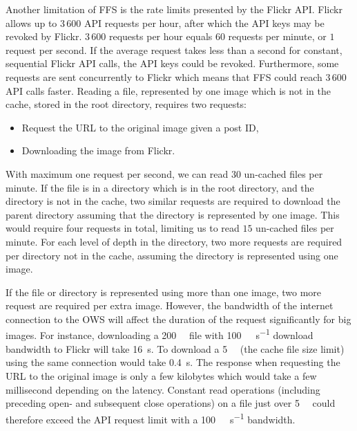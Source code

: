 Another limitation of \gls{FFS} is the rate limits presented by the Flickr \gls{API}. Flickr allows up to $3\,600$ \gls{API} requests per hour, after which the \gls{API} keys may be revoked by Flickr. $3\,600$ requests per hour equals $60$ requests per minute, or $1$ request per second. If the average request takes less than a second for constant, sequential Flickr \gls{API} calls, the \gls{API} keys could be revoked. Furthermore, some requests are sent concurrently to Flickr which means that \gls{FFS} could reach $3\,600$ \gls{API} calls faster. Reading a file, represented by one image which is not in the cache, stored in the root directory, requires two requests:
\begin{itemize}
	\item Request the URL to the original image given a post ID,
	\item Downloading the image from Flickr. 
\end{itemize}
With maximum one request per second, we can read $30$ un-cached files per minute. If the file is in a directory which is in the root directory, and the directory is not in the cache, two similar requests are required to download the parent directory assuming that the directory is represented by one image. This would require four requests in total, limiting us to read $15$ un-cached files per minute. For each level of depth in the directory, two more requests are required per directory not in the cache, assuming the directory is represented using one image. 

If the file or directory is represented using more than one image, two more request are required per extra image. However, the bandwidth of the internet connection to the \gls{OWS} will affect the duration of the request significantly for big images. For instance, downloading a \SI[per-mode = symbol]{200}{\mega\byte} file with \SI[per-mode = symbol]{100}{\mega\bit\per\second} download bandwidth to Flickr will take \SI[per-mode = symbol]{16}{\second}. To download a \SI[per-mode = symbol]{5}{\mega\byte} (the cache file size limit) using the same connection would take \SI[per-mode = symbol]{0.4}{\second}. The response when requesting the URL to the original image is only a few kilobytes which would take a few millisecond depending on the latency. Constant read operations (including preceding open- and subsequent close operations) on a file just over \SI[per-mode = symbol]{5}{\mega\byte} could therefore exceed the \gls{API} request limit with a \SI[per-mode = symbol]{100}{\mega\bit\per\second} bandwidth.

